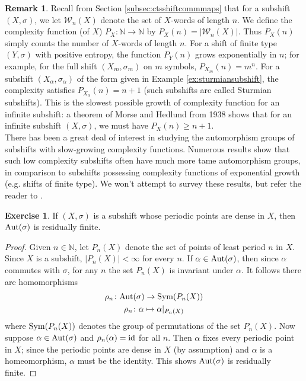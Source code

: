 \documentclass{amsart}
\newcommand{\si}{\index}
\theoremstyle{definition}
\newtheorem{rem}[equation]{Remark}
\newtheorem{exer}[equation]{Exercise}
\theoremstyle{definition}
\newcommand{\aut}{\textnormal{Aut}}
\newcommand{\sym}{\textnormal{Sym}}
\numberwithin{equation}{subsection}
\begin{document}
\begin{rem}\label{apprem:lowcomplexity}
Recall from Section \ref{subsec:ctsshiftcommmaps} that for a subshift $(X,\sigma)$, we let $\mathcal{W}_{n}(X)$ denote the set of $X$-words of length $n$. We define the complexity function (of $X$) $P_{X} \colon \mathbb{N} \to \mathbb{N}$ by $P_{X}(n) = |\mathcal{W}_{n}(X)|$. Thus $P_{X}(n)$ simply counts the number of $X$-words of length $n$. For a shift of finite type $(Y,\sigma)$ with positive entropy, the function $P_{Y}(n)$ grows exponentially in $n$; for example, for the full shift $(X_{m},\sigma_{m})$ on $m$ symbols, $P_{X_{m}}(n) = m^{n}$. For a subshift $(X_{\alpha},\sigma_{\alpha})$ of the form given in Example \ref{ex:sturmiansubshift}, the complexity satisfies $P_{X_{\alpha}}(n) = n+1$ (such subshifts are called Sturmian subshifts). This is the slowest possible growth of complexity function for an infinite subshift: a theorem of Morse and Hedlund \cite{MH1938} from 1938 shows that for an infinite subshift $(X,\sigma)$, we must have $P_{X}(n) \ge n+1$.\\
\indent There has been a great deal of interest in studying the automorphism groups\si{automorphism group} of subshifts with slow-growing complexity functions. Numerous results show that such low complexity subshifts often have much more tame automorphism groups\si{automorphism group}, in comparison to subshifts possessing complexity functions of exponential growth (e.g. shifts of finite type). We won't attempt to survey these results, but refer the reader to \cite{DDMP2016,HP1989,Coven1971,Olli2013,SaloTorma2015,CyrKra2016,CyrKra2015,CyrKra2016strexp}.
\end{rem}

\begin{exer}\label{appex:denppresfin}
If $(X,\sigma)$ is a subshift whose periodic points are dense in $X$, then $\aut(\sigma)$ is residually finite.
\end{exer}
\begin{proof}
Given $n \in \mathbb{N}$, let $P_{n}(X)$ denote the set of points of least period $n$ in $X$. Since $X$ is a subshift, $|P_{n}(X)|<\infty$ for every $n$. If $\alpha \in \aut(\sigma)$, then since $\alpha$ commutes with $\sigma$, for any $n$ the set $P_{n}(X)$ is invariant under $\alpha$. It follows there are homomorphisms
\begin{equation*}
\begin{gathered}
\rho_{n} \colon \aut(\sigma) \to \sym(P_{n}(X))\\
\rho_{n} \colon \alpha \mapsto \alpha|_{P_{n}(X)}
\end{gathered}
\end{equation*}
where $\sym(P_{n}(X))$ denotes the group of permutations of the set $P_{n}(X)$. Now suppose $\alpha \in \aut(\sigma)$ and $\rho_{n}(\alpha)=\textnormal{id}$ for all $n$. Then $\alpha$ fixes every periodic point in $X$; since the periodic points are dense in $X$ (by assumption) and $\alpha$ is a homeomorphism, $\alpha$ must be the identity. This shows $\aut(\sigma)$ is residually finite.
\end{proof}
\end{document}
